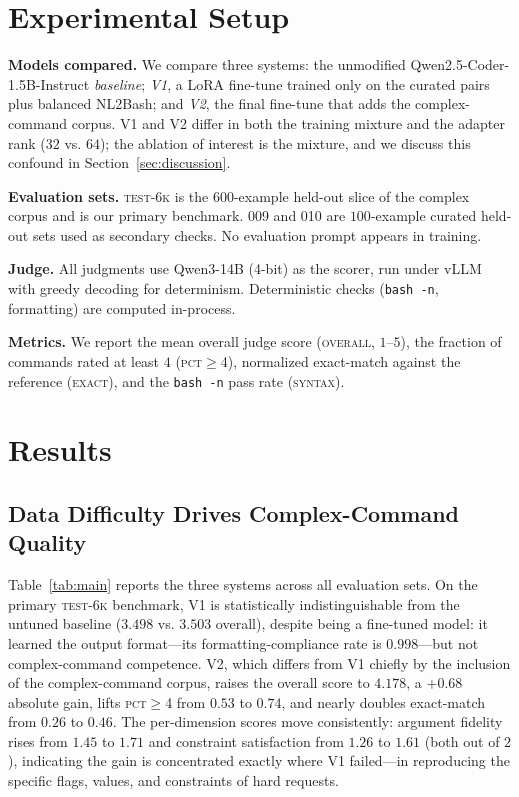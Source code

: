 \documentclass[conference]{IEEEtran}
\begin{document}
\section{Experimental Setup}

\textbf{Models compared.} We compare three systems: the unmodified
Qwen2.5-Coder-1.5B-Instruct \emph{baseline}; \emph{V1}, a LoRA fine-tune trained
only on the curated pairs plus balanced NL2Bash; and \emph{V2}, the final
fine-tune that adds the complex-command corpus. V1 and V2 differ in both the
training mixture and the adapter rank ($32$ vs. $64$); the ablation of interest
is the mixture, and we discuss this confound in Section~\ref{sec:discussion}.

\textbf{Evaluation sets.} \textsc{test-6k} is the $600$-example held-out slice of
the complex corpus and is our primary benchmark. \textsc{009} and \textsc{010}
are $100$-example curated held-out sets used as secondary checks. No evaluation
prompt appears in training.

\textbf{Judge.} All judgments use Qwen3-14B (4-bit) as the scorer, run under
vLLM with greedy decoding for determinism. Deterministic checks (\texttt{bash
-n}, formatting) are computed in-process.

\textbf{Metrics.} We report the mean overall judge score
(\textsc{overall}, $1$--$5$), the fraction of commands rated at least $4$
(\textsc{pct}$\geq$\textsc{4}), normalized exact-match against the reference
(\textsc{exact}), and the \texttt{bash -n} pass rate (\textsc{syntax}).

\section{Results}

\subsection{Data Difficulty Drives Complex-Command Quality}

Table~\ref{tab:main} reports the three systems across all evaluation sets. On the
primary \textsc{test-6k} benchmark, V1 is statistically indistinguishable from
the untuned baseline ($3.498$ vs. $3.503$ overall), despite being a fine-tuned
model: it learned the output format---its formatting-compliance rate is
$0.998$---but not complex-command competence. V2, which differs from V1 chiefly
by the inclusion of the complex-command corpus, raises the overall score to
$4.178$, a $+0.68$ absolute gain, lifts \textsc{pct}$\geq$\textsc{4} from
$0.53$ to $0.74$, and nearly doubles exact-match from $0.26$ to $0.46$. The
per-dimension scores move consistently: argument fidelity rises from $1.45$ to
$1.71$ and constraint satisfaction from $1.26$ to $1.61$ (both out of $2$),
indicating the gain is concentrated exactly where V1 failed---in reproducing the
specific flags, values, and constraints of hard requests.
\end{document}
